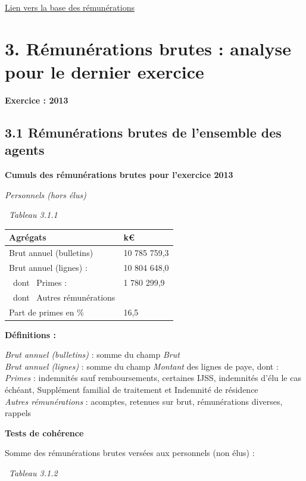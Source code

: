 \href{../Bases/Remunerations/Analyse.remunerations.csv}{Lien vers la base
des rémunérations}

\newpage

\hypertarget{remunerations-brutes-analyse-pour-le-dernier-exercice}{%
\section{3. Rémunérations brutes : analyse pour le dernier
exercice}\label{remunerations-brutes-analyse-pour-le-dernier-exercice}}

\textbf{Exercice : 2013 }

\hypertarget{remunerations-brutes-de-lensemble-des-agents-1}{%
\subsection{3.1 Rémunérations brutes de l'ensemble des
agents}\label{remunerations-brutes-de-lensemble-des-agents-1}}

\textbf{Cumuls des rémunérations brutes pour l'exercice 2013 }

\emph{Personnels (hors élus)}

~\emph{Tableau 3.1.1}

\begin{longtable}[]{@{}ll@{}}
\toprule
Agrégats & k€\tabularnewline
\midrule
\endhead
Brut annuel (bulletins) & 10 785 759,3\tabularnewline
Brut annuel (lignes) : & 10 804 648,0\tabularnewline
~dont ~Primes : & 1 780 299,9\tabularnewline
~dont ~Autres rémunérations &\tabularnewline
Part de primes en \% & 16,5\tabularnewline
\bottomrule
\end{longtable}

\textbf{Définitions :}

\emph{Brut annuel (bulletins)} : somme du champ \emph{Brut}\\
\emph{Brut annuel (lignes)} : somme du champ \emph{Montant} des lignes
de paye, dont :\\
\emph{Primes} : indemnités sauf remboursements, certaines IJSS,
indemnités d'élu le cas échéant, Supplément familial de traitement et
Indemnité de résidence\\
\emph{Autres rémunérations} : acomptes, retenues sur brut, rémunérations
diverses, rappels

\textbf{Tests de cohérence}

Somme des rémunérations brutes versées aux personnels (non élus) :

~\emph{Tableau 3.1.2}

